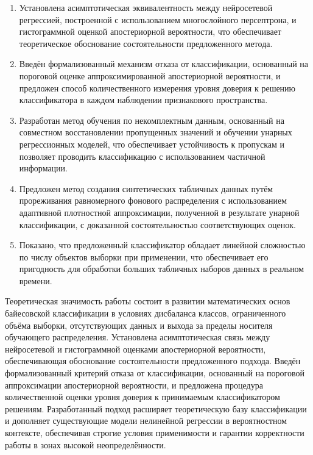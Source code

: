 \begin{enumerate}[beginpenalty=10000] %
  \item Установлена асимптотическая эквивалентность между нейросетевой регрессией, построенной с использованием многослойного персептрона, и гистограммной оценкой апостериорной вероятности, что обеспечивает теоретическое обоснование состоятельности предложенного метода.
  \item Введён формализованный механизм отказа от классификации, основанный на пороговой оценке аппроксимированной апостериорной вероятности, и предложен способ количественного измерения уровня доверия к решению классификатора в каждом наблюдении признакового пространства.
  \item Разработан метод обучения по некомплектным данным, основанный на совместном восстановлении пропущенных значений и обучении унарных регрессионных моделей, что обеспечивает устойчивость к пропускам и позволяет проводить классификацию с использованием частичной информации.
  \item Предложен метод создания синтетических табличных данных путём прореживания равномерного фонового распределения с использованием адаптивной плотностной аппроксимации, полученной в результате унарной классификации, с доказанной состоятельностью соответствующих оценок.
  \item Показано, что предложенный классификатор обладает линейной сложностью по числу объектов выборки при применении, что обеспечивает его пригодность для обработки больших табличных наборов данных в реальном времени.
\end{enumerate}

{\influence}

Теоретическая значимость работы состоит в развитии математических основ байесовской классификации в условиях дисбаланса классов, ограниченного объёма выборки, отсутствующих данных и выхода за пределы носителя обучающего распределения. Установлена асимптотическая связь между нейросетевой и гистограммной оценками апостериорной вероятности, обеспечивающая обоснование состоятельности предложенного подхода. Введён формализованный критерий отказа от классификации, основанный на пороговой аппроксимации апостериорной вероятности, и предложена процедура количественной оценки уровня доверия к принимаемым классификатором решениям. Разработанный подход расширяет теоретическую базу классификации и дополняет существующие модели нелинейной регрессии в вероятностном контексте, обеспечивая строгие условия применимости и гарантии корректности работы в зонах высокой неопределённости.

